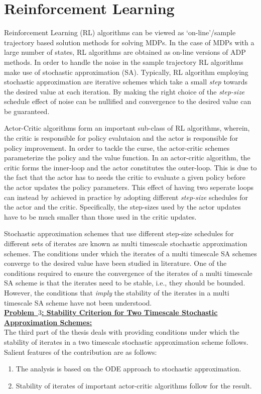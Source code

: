 \section{Reinforcement Learning}
Reinforcement Learning (RL) algorithms can be viewed as `on-line'/sample trajectory based solution methods for solving MDPs. In the case of MDPs with a large number of states, RL algorithms are obtained as on-line versions of ADP methods. In order to handle the noise in the sample trajectory RL algorithms make use of stochastic approximation (SA). Typically, RL algorithm employing stochastic approximation are iterative schemes which take a small \emph{step} towards the desired value at each iteration. By making the right choice of the \emph{step-size} schedule effect of noise can be nullified and convergence to the desired value can be guaranteed.\par
Actor-Critic algorithms form an important sub-class of RL algorithms, wherein, the critic is responsible for policy evalutaion and the actor is responsible for policy improvement. In order to tackle the curse, the actor-critic schemes parameterize the policy and the value function. In an actor-critic algorithm, the critic forms the inner-loop and the actor constitutes the outer-loop. This is due to the fact that the actor has to needs the critic to evaluate a given policy before the actor updates the policy parameters. This effect of having two seperate loops can instead by achieved in practice by adopting different \emph{step-size} schedules for the actor and the critic. Specifically, the step-sizes used by the actor updates have to be much smaller than those used in the critic updates.\par
Stochastic approximation schemes that use different step-size schedules for different sets of iterates are known as multi timescale stochastic approximation schemes. The conditions under which the iterates of a multi timescale SA schemes converge to the desired value have been studied in literature. One of the conditions required to ensure the convergence of the iterates of a multi timescale SA scheme is that the iterates need to be stable, i.e., they should be bounded. However, the conditions that \emph{imply} the stability of the iterates in a multi timescale SA scheme have not been understood.\\
\textbf{\underline{Problem~$3$: Stability Criterion for Two Timescale Stochastic Approximation Schemes:}}\\
The third part of the thesis deals with providing conditions under which the stability of iterates in a two timescale stochastic approximation scheme follows. Salient features of the contribution are as follows:
\begin{enumerate}
\item The analysis is based on the ODE approach to stochastic approximation.
\item Stability of iterates of important actor-critic algorithms follow for the result.
\end{enumerate}

